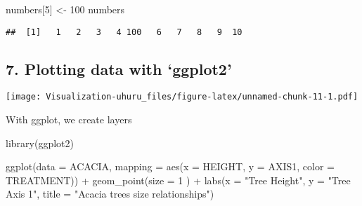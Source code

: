 \documentclass[
]{article}
\newenvironment{Shaded}{\begin{snugshade}}{\end{snugshade}}
\newcommand{\AttributeTok}[1]{\textcolor[rgb]{0.77,0.63,0.00}{#1}}
\newcommand{\DecValTok}[1]{\textcolor[rgb]{0.00,0.00,0.81}{#1}}
\newcommand{\FunctionTok}[1]{\textcolor[rgb]{0.00,0.00,0.00}{#1}}
\newcommand{\NormalTok}[1]{#1}
\newcommand{\OtherTok}[1]{\textcolor[rgb]{0.56,0.35,0.01}{#1}}
\newcommand{\SpecialCharTok}[1]{\textcolor[rgb]{0.00,0.00,0.00}{#1}}
\newcommand{\StringTok}[1]{\textcolor[rgb]{0.31,0.60,0.02}{#1}}
\begin{document}
\begin{Shaded}
\begin{Highlighting}[]
\NormalTok{numbers[}\DecValTok{5}\NormalTok{] }\OtherTok{\textless{}{-}} \DecValTok{100}
\NormalTok{numbers}
\end{Highlighting}
\end{Shaded}

\begin{verbatim}
##  [1]   1   2   3   4 100   6   7   8   9  10
\end{verbatim}

\hypertarget{plotting-data-with-ggplot2}{%
\subsection{7. Plotting data with
`ggplot2'}\label{plotting-data-with-ggplot2}}

\begin{Shaded}
\end{Shaded}

\texttt{[image: Visualization-uhuru\_files/figure-latex/unnamed-chunk-11-1.pdf]}

With ggplot, we create layers

\begin{Shaded}
\begin{Highlighting}[]
\FunctionTok{library}\NormalTok{(ggplot2)}

\FunctionTok{ggplot}\NormalTok{(}\AttributeTok{data =}\NormalTok{ ACACIA, }\AttributeTok{mapping =} \FunctionTok{aes}\NormalTok{(}\AttributeTok{x =}\NormalTok{ HEIGHT, }\AttributeTok{y =}\NormalTok{ AXIS1, }\AttributeTok{color =}\NormalTok{ TREATMENT)) }\SpecialCharTok{+} \FunctionTok{geom\_point}\NormalTok{(}\AttributeTok{size =} \DecValTok{1}\NormalTok{ ) }\SpecialCharTok{+} \FunctionTok{labs}\NormalTok{(}\AttributeTok{x =} \StringTok{"Tree Height"}\NormalTok{, }\AttributeTok{y =} \StringTok{"Tree Axis 1"}\NormalTok{, }\AttributeTok{title =} \StringTok{"Acacia trees size relationships"}\NormalTok{)}
\end{Highlighting}
\end{Shaded}
\end{document}
